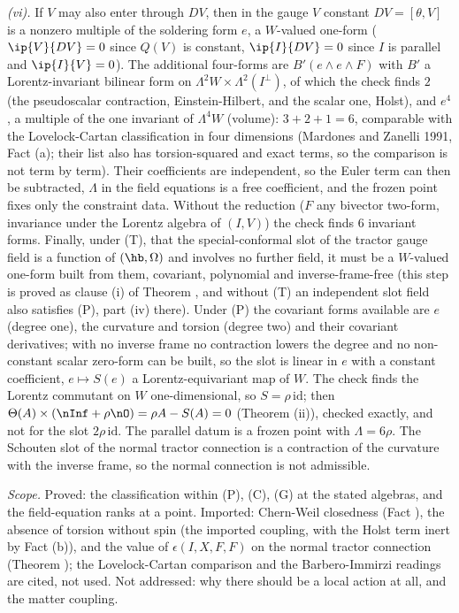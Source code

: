 \emph{(vi).} If $V$ may also enter through $DV$, then in the gauge $V$ constant $DV = [\theta, V]$ is a nonzero multiple of the soldering form $e$, a $W$-valued one-form ($\ip{V}{DV} = 0$ since $Q(V)$ is constant, $\ip{I}{DV} = 0$ since $I$ is parallel and $\ip{I}{V} = 0$). The additional four-forms are $B'(e \wedge e \wedge F)$ with $B'$ a Lorentz-invariant bilinear form on $\Lambda^{2}W \times \Lambda^{2}(I^{\perp})$, of which the check finds $2$ (the pseudoscalar contraction, Einstein-Hilbert, and the scalar one, Holst), and $e^{4}$, a multiple of the one invariant of $\Lambda^{4}W$ (volume): $3 + 2 + 1 = 6$, comparable with the Lovelock-Cartan classification in four dimensions (Mardones and Zanelli 1991, Fact (a); their list also has torsion-squared and exact terms, so the comparison is not term by term). Their coefficients are independent, so the Euler term can then be subtracted, $\Lambda$ in the field equations is a free coefficient, and the frozen point fixes only the constraint data. Without the reduction ($F$ any bivector two-form, invariance under the Lorentz algebra of $(I, V)$) the check finds $6$ invariant forms. Finally, under (T), that the special-conformal slot of the tractor gauge field is a function of $(\hb, \Omega)$ and involves no further field, it must be a $W$-valued one-form built from them, covariant, polynomial and inverse-frame-free (this step is proved as clause (i) of Theorem , and without (T) an independent slot field also satisfies (P), part (iv) there). Under (P) the covariant forms available are $e$ (degree one), the curvature and torsion (degree two) and their covariant derivatives; with no inverse frame no contraction lowers the degree and no non-constant scalar zero-form can be built, so the slot is linear in $e$ with a constant coefficient, $e \mapsto S(e)$ a Lorentz-equivariant map of $W$. The check finds the Lorentz commutant on $W$ one-dimensional, so $S = \rho\,\mathrm{id}$; then $\Theta(A) \times (\nInf + \rho\nO) = \rho A - S(A) = 0$ (Theorem (ii)), checked exactly, and not for the slot $2\rho\,\mathrm{id}$. The parallel datum is a frozen point with $\Lambda = 6\rho$. The Schouten slot of the normal tractor connection is a contraction of the curvature with the inverse frame, so the normal connection is not admissible.

\emph{Scope.} Proved: the classification within (P), (C), (G) at the stated algebras, and the field-equation ranks at a point. Imported: Chern-Weil closedness (Fact ), the absence of torsion without spin (the imported coupling, with the Holst term inert by Fact (b)), and the value of $\epsilon(I, X, F, F)$ on the normal tractor connection (Theorem ); the Lovelock-Cartan comparison and the Barbero-Immirzi readings are cited, not used. Not addressed: why there should be a local action at all, and the matter coupling.
